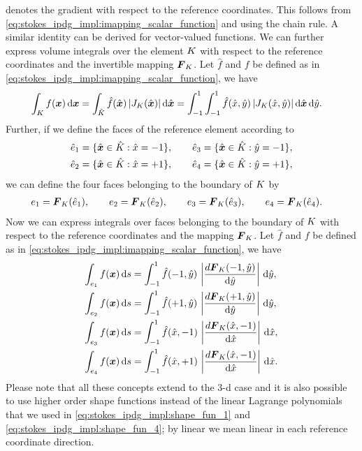 \documentclass{scrreprt}
\begin{document}
denotes the gradient with respect to the reference coordinates. This follows
from \eqref{eq:stokes_ipdg_impl:imapping_scalar_function} and using the chain rule.
A similar identity can be derived for vector-valued functions.
We can further express volume integrals over the element $K$
with respect to the reference coordinates and the invertible mapping ${\boldsymbol F}_{K}$.
Let $\hat{f}$ and $f$ be defined as in \eqref{eq:stokes_ipdg_impl:imapping_scalar_function},
we have
\begin{align}
\int_K f({\boldsymbol x})\,\text{d}{\boldsymbol x} &= \int_{\hat{K}} \hat{f}(\hat{{\boldsymbol x}})\,|J_K(\hat{{\boldsymbol x}})|\,\textup{d}\hat{{\boldsymbol x}}
=
\int_{-1}^1\int_{-1}^1 \hat{f}(\hat{x},\hat{y})\,|J_K(\hat{x},\hat{y})|\,\textup{d}\hat{{\boldsymbol x}}\,\textup{d}\hat{y}.
\notag
\end{align}
Further, if we define the faces of the reference element according to
\begin{align}
\hat{e}_{1} &= \{ \hat{{\boldsymbol x}} \in \hat{K} : \hat{x} = -1\},\qquad
\hat{e}_{3} = \{ \hat{{\boldsymbol x}} \in \hat{K} : \hat{y} = -1\},
\notag\\
\hat{e}_{2} &= \{ \hat{{\boldsymbol x}} \in \hat{K} : \hat{x} = +1\},\qquad
\hat{e}_{4} = \{ \hat{{\boldsymbol x}} \in \hat{K} : \hat{y} = +1\},
\notag
\end{align}
we can define the four faces belonging to the boundary of $K$ by
\begin{align}
e_{1} &= {\boldsymbol F}_{K}(\hat{e}_1),\qquad
e_{2} = {\boldsymbol F}_{K}(\hat{e}_2),\qquad
e_{3} = {\boldsymbol F}_{K}(\hat{e}_3),\qquad
e_{4} = {\boldsymbol F}_{K}(\hat{e}_4).
\notag
\end{align}
Now we can express integrals over faces belonging to the boundary of $K$ with respect to
the reference coordinates and the mapping ${\boldsymbol F}_{K}$.
Let $\hat{f}$ and $f$ be defined as in \eqref{eq:stokes_ipdg_impl:imapping_scalar_function},
we have
\begin{align}
\int_{e_1} f({\boldsymbol x})\,\text{d}s &=
\int_{-1}^1\hat{f}(-1,\hat{y})\,\left|\frac{d{\boldsymbol F}_{K}(-1,\hat{y})}{\textup{d}\hat{y}}\right|\,\textup{d}\hat{y},
\notag\\
\int_{e_2} f({\boldsymbol x})\,\text{d}s &=
\int_{-1}^1\hat{f}(+1,\hat{y})\,\left|\frac{d{\boldsymbol F}_{K}(+1,\hat{y})}{\textup{d}\hat{y}}\right|\,\textup{d}\hat{y},
\notag\\
\int_{e_3} f({\boldsymbol x})\,\text{d}s &=
\int_{-1}^1\hat{f}(\hat{x},-1)\,\left|\frac{d{\boldsymbol F}_{K}(\hat{x},-1)}{\textup{d}\hat{x}}\right|\,\textup{d}\hat{x},
\notag\\
\int_{e_4} f({\boldsymbol x})\,\text{d}s &=
\int_{-1}^1\hat{f}(\hat{x},+1)\,\left|\frac{d{\boldsymbol F}_{K}(\hat{x},-1)}{\textup{d}\hat{x}}\right|\,\textup{d}\hat{x}.
\notag
\end{align}
Please note that all these concepts extend to the 3-d case and it is also
possible to use higher order shape functions instead of the linear
Lagrange polynomials that we used in \eqref{eq:stokes_ipdg_impl:shape_fun_1} and
\eqref{eq:stokes_ipdg_impl:shape_fun_4}; by linear we mean
linear in each reference coordinate direction.
\end{document}
